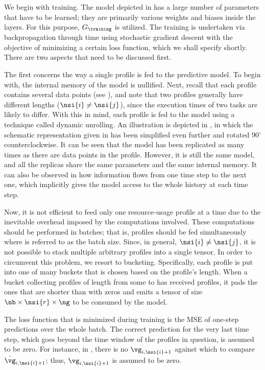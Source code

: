 We begin with training. The model depicted in  has
a large number of parameters that have to be learned; they are primarily various
weights and biases inside the layers. For this purpose, $G_\training$ is
utilized. The training is undertaken via backpropagation through time using
stochastic gradient descent \cite{goodfellow2016} with the objective of
minimizing a certain loss function, which we shall specify shortly. There are
two aspects that need to be discussed first.

The first concerns the way a single profile is fed to the predictive model. To
begin with, the internal memory of the model is nullified. Next, recall that
each profile contains several data points (see ), and note
that two profiles generally have different lengths ($\nsi{i} \neq \nsi{j}$),
since the execution times of two tasks are likely to differ. With this in mind,
each profile is fed to the model using a technique called dynamic unrolling. An
illustration is depicted in , in which the schematic
representation given in  has been simplified even
further and rotated 90${}^\circ$ counterclockwise. It can be seen that the model
has been replicated as many times as there are data points in the profile.
However, it is still the same model, and all the replicas share the same
parameters and the same internal memory. It can also be observed in
 how information flows from one time step to the next
one, which implicitly gives the model access to the whole history at each time
step.

Now, it is not efficient to feed only one resource-usage profile at a time due
to the inevitable overhead imposed by the computations involved. These
computations should be performed in batches; that is, \nb profiles should be fed
simultaneously where \nb is referred to as the batch size. Since, in general,
$\nsi{i} \neq \nsi{j}$, it is not possible to stack multiple arbitrary profiles
into a single tensor. In order to circumvent this problem, we resort to
bucketing. Specifically, each profile is put into one of many buckets that is
chosen based on the profile's length. When a bucket collecting profiles of
length from some  to  has received \nb profiles, it pads the ones
that are shorter than  with zeros and emits a tensor of size $\nb \times
\nsi{r} \times \ng$ to be consumed by the model.

The loss function that is minimized during training is the \ac{MSE} of one-step
predictions over the whole batch. The correct prediction for the very last time
step, which goes beyond the time window of the profiles in question, is assumed
to be zero. For instance, in , there is no $\vg_{i,
\nsi{i} + 1}$ against which to compare $\hat{\vg}_{i, \nsi{i} + 1}$; thus,
$\vg_{i, \nsi{i} + 1}$ is assumed to be zero.

